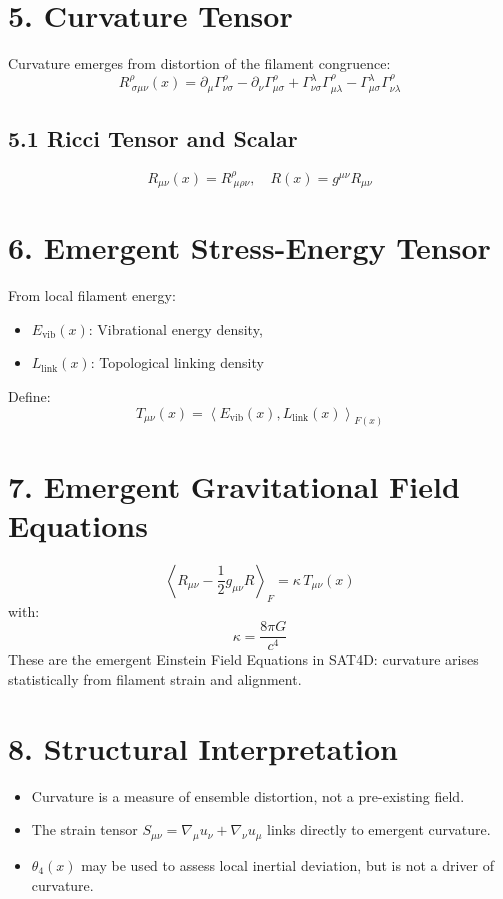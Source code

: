 \documentclass[12pt]{article}
\begin{document}
\section*{5. Curvature Tensor}

Curvature emerges from distortion of the filament congruence:
\[
R^\rho_{\ \sigma\mu\nu}(x) = \partial_\mu \Gamma^\rho_{\nu\sigma} - \partial_\nu \Gamma^\rho_{\mu\sigma} + \Gamma^\lambda_{\nu\sigma} \Gamma^\rho_{\mu\lambda} - \Gamma^\lambda_{\mu\sigma} \Gamma^\rho_{\nu\lambda}
\]

\subsection*{5.1 Ricci Tensor and Scalar}

\[
R_{\mu\nu}(x) = R^\rho_{\ \mu\rho\nu}, \quad R(x) = g^{\mu\nu} R_{\mu\nu}
\]

\section*{6. Emergent Stress-Energy Tensor}

From local filament energy:

\begin{itemize}
    \item \( E_{\text{vib}}(x) \): Vibrational energy density,
    \item \( L_{\text{link}}(x) \): Topological linking density
\end{itemize}

Define:
\[
T_{\mu\nu}(x) = \left\langle E_{\text{vib}}(x), L_{\text{link}}(x) \right\rangle_{F(x)}
\]

\section*{7. Emergent Gravitational Field Equations}

\[
\left\langle R_{\mu\nu} - \frac{1}{2} g_{\mu\nu} R \right\rangle_{F} = \kappa \, T_{\mu\nu}(x)
\]
with:
\[
\kappa = \frac{8\pi G}{c^4}
\]
These are the emergent Einstein Field Equations in SAT4D: curvature arises statistically from filament strain and alignment.

\section*{8. Structural Interpretation}

\begin{itemize}
    \item Curvature is a measure of ensemble distortion, not a pre-existing field.
    \item The strain tensor \( S_{\mu\nu} = \nabla_\mu u_\nu + \nabla_\nu u_\mu \) links directly to emergent curvature.
    \item \(\theta_4(x)\) may be used to assess local inertial deviation, but is not a driver of curvature.
\end{itemize}
\end{document}
